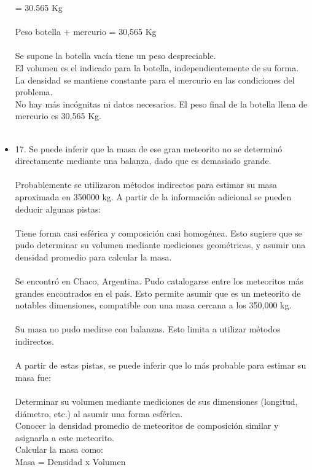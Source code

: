 \documentclass{article}
\begin{document}
\begin{itemize}
= 30.565 Kg\\
\\
Peso botella + mercurio = 30,565 Kg\\
\\
Se supone la botella vacía tiene un peso despreciable.\\
El volumen es el indicado para la botella, independientemente de su forma.\\
La densidad se mantiene constante para el mercurio en las condiciones del problema.\\
No hay más incógnitas ni datos necesarios. El peso final de la botella llena de mercurio es 30,565 Kg.\\
\\
\item{17.}
Se puede inferir que la masa de ese gran meteorito no se determinó directamente mediante una balanza, dado que es demasiado grande.\\
\\
Probablemente se utilizaron métodos indirectos para estimar su masa aproximada en 350000 kg. A partir de la información adicional se pueden deducir algunas pistas:\\
\\
Tiene forma casi esférica y composición casi homogénea. Esto sugiere que se pudo determinar su volumen mediante mediciones geométricas, y asumir una densidad promedio para calcular la masa.\\
\\
Se encontró en Chaco, Argentina. Pudo catalogarse entre los meteoritos más grandes encontrados en el país. Esto permite asumir que es un meteorito de notables dimensiones, compatible con una masa cercana a los 350,000 kg.\\
\\
Su masa no pudo medirse con balanzas. Esto limita a utilizar métodos indirectos.\\
\\
A partir de estas pistas, se puede inferir que lo más probable para estimar su masa fue:\\
\\
Determinar su volumen mediante mediciones de sus dimensiones (longitud, diámetro, etc.) al asumir una forma esférica.\\
Conocer la densidad promedio de meteoritos de composición similar y asignarla a este meteorito.\\
Calcular la masa como:\\
Masa = Densidad x Volumen\\

\end{itemize}
\end{document}
